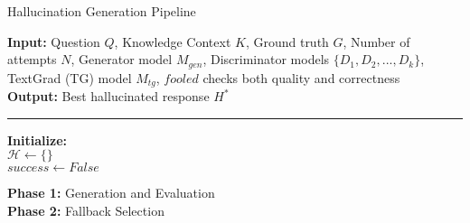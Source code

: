 \begin{algorithm}[t]
\small
\caption{Hallucination Generation Pipeline} \label{alg:one}
\textbf{Input:} Question $Q$, Knowledge Context $K$, Ground truth $G$,
Number of attempts $N$,
Generator model $M_{gen}$, Discriminator models $\{D_1, D_2, ..., D_k\}$,
TextGrad (TG) model $M_{tg}$, $fooled$ checks both quality and correctness\\
\textbf{Output:} Best hallucinated response $H^*$
\vspace{1mm}
\hrule
\vspace{1mm}
\textbf{Initialize:}\\
$\mathcal{H} \leftarrow \{\}$ \\
$success \leftarrow False$

\textbf{Phase 1:} Generation and Evaluation\\
\textbf{Phase 2:} Fallback Selection\\
\end{algorithm}